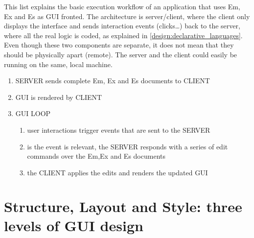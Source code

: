This list explains the basic execution workflow of an application that uses Em, Ex and Es as GUI fronted. The architecture is server/client, where the client only displays the interface and sends interaction events (clicks\ldots) back to the server, where all the real logic is coded, as explained in \ref{design:declarative_languages}. Even though these two components are separate, it does not mean that they should be physically apart (remote). The server and the client could easily be running on the same, local machine.

\begin{enumerate}
    \item SERVER sends complete Em, Ex and Es documents to CLIENT
    \item GUI is rendered by CLIENT
    \item GUI LOOP
        \begin{enumerate}
            \item user interactions trigger events that are sent to the SERVER
            \item is the event is relevant, the SERVER responds with a series of edit commands over the Em,Ex and Es documents
            \item the CLIENT applies the edits and renders the updated GUI
        \end{enumerate}
\end{enumerate}

\section{Structure, Layout and Style: three levels of GUI design}

